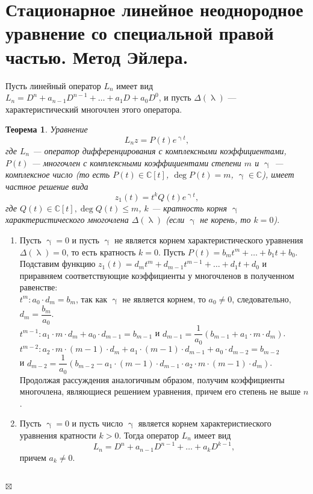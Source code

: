 \documentclass[a4paper, 12pt]{report}
\newenvironment{Proof} %
{\par\noindent{$\blacklozenge$}} %
{\hfill$\scriptstyle\boxtimes$}
\newcommand{\Cm}{\mathbb{C}}
\renewcommand{\lambda}{\uplambda}
\newcommand{\Ln}{L_n = D^n + a_{n-1}D^{n-1} + \ldots + a_1D + a_0D^0}
\begin{document}
\section{Стационарное линейное неоднородное уравнение со специальной правой частью. Метод Эйлера.}
Пусть линейный оператор $L_n$ имеет вид $\Ln$, и пусть $\Delta(\lambda)$ --- характеристический многочлен этого оператора.
\newtheorem*{2_5_1}{Теорема}\begin{2_5_1}
	Уравнение $$L_nz = P(t)e^{\upgamma t},$$ где $L_n$ --- оператор дифференцирования с комплексными коэффициентами, $P(t)$ --- многочлен с комплексными коэффициентами степени $m$ и $\upgamma$ --- комплексное число (то есть $P(t)\in\Cm[t]$, $\deg P(t) = m$, $\upgamma \in \Cm$), имеет частное решение вида $$z_1(t) = t^kQ(t)e^{\upgamma t},$$ где $Q(t) \in \Cm[t], \deg Q(t) \leqslant m$, $k$ --- кратность корня $\upgamma$ характеристического многочлена $\Delta(\lambda)$ (если $\upgamma$ не корень, то $k=0$).
\end{2_5_1}\begin{Proof}
\begin{enumerate}
	\item Пусть $\upgamma = 0$ и пусть $\upgamma$ не является корнем характеристического уравнения $\Delta(\lambda) = 0$, то есть кратность $k = 0$. Пусть $P(t) = b_mt^m + \ldots + b_1t + b_0$. Подставим функцию $z_1(t) = d_mt^m + d_{m-1}t^{m-1} + \ldots + d_1t + d_0$ и приравняем соответствующие коэффициенты у многочленов в полученном равенстве:\\
	$t^m : a_0\cdot d_m = b_m$, так как $\upgamma$ не является корнем, то $a_0 \ne 0$, следовательно, $d_m = \dfrac{b_m}{a_0}$.\\
	$t^{m-1} : a_1\cdot m\cdot d_m + a_0\cdot  d_{m-1}= b_{m-1}$ и $d_{m-1} = \dfrac{1}{a_0}(b_{m-1} + a_1\cdot m \cdot d_m)$.\\
	$t^{m-2} : a_2\cdot m\cdot (m-1)\cdot d_m + a_1\cdot (m-1) \cdot d_{m-1} + a_0 \cdot d_{m-2} = b_{m-2}$\\ и $d_{m-2} = \dfrac{1}{a_0}(b_{m-2} - a_1\cdot (m-1)\cdot d_{m-1}\cdot a_2\cdot m\cdot (m-1)\cdot d_m)$.\\
	Продолжая рассуждения аналогичным образом, получим коэффициенты многочлена, являющиеся решением уравнения, причем его степень не выше $n$.
	\item Пусть $\upgamma = 0$ и пусть число $\upgamma$ является корнем характеристиеского уравнения кратности $k > 0$. Тогда оператор $L_n$ имеет вид $$L_n = D^n + a_{n-1}D^{n-1} + \ldots + a_k D^{k-1},$$ причем $a_k \ne 0$.\\\\

\end{enumerate}
\end{Proof}
\end{document}
